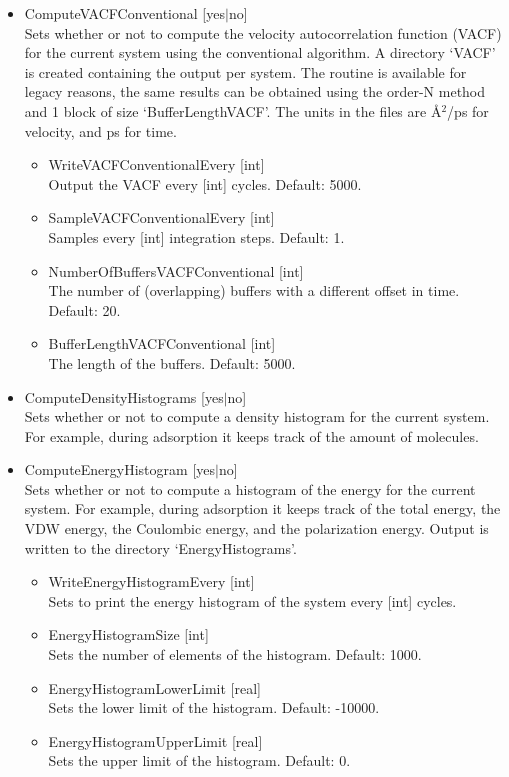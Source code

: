 \begin{itemize}
\item{ComputeVACFConventional [yes$|$no]}\\
Sets whether or not to compute the velocity autocorrelation function (VACF) for the current system using the conventional algorithm.
A directory `VACF' is created containing the output per system. The routine is available for legacy reasons, 
the same results can be obtained using the order-N method and 1 block of size `BufferLengthVACF'.
The units in the files are \AA$^2$/ps for velocity, and ps for time.
  \begin{itemize}
    \item{WriteVACFConventionalEvery [int]}\\
     Output the VACF every [int] cycles. Default: 5000.
    \item{SampleVACFConventionalEvery [int]}\\
    Samples every [int] integration steps. Default: 1.
    \item{NumberOfBuffersVACFConventional [int]}\\
    The number of (overlapping) buffers with a different offset in time. Default: 20.
    \item{BufferLengthVACFConventional [int]}\\
    The length of the buffers. Default: 5000.
   \end{itemize}

\item{ComputeDensityHistograms [yes$|$no]}\\
Sets whether or not to compute a density histogram for the current system. For example, during adsorption it keeps track of the amount of molecules.

\item{ComputeEnergyHistogram [yes$|$no]}\\
Sets whether or not to compute a histogram of the energy for the current system. 
For example, during adsorption it keeps track of the total energy, the VDW energy,
the Coulombic energy, and the polarization energy. Output is written to  the directory
`EnergyHistograms'.
\begin{itemize}
\item{WriteEnergyHistogramEvery [int]}\\
Sets to print the energy histogram of the system every [int] cycles.
\item{EnergyHistogramSize [int]}\\
Sets the number of elements of the histogram. Default: 1000.
\item{EnergyHistogramLowerLimit [real]}\\
Sets the lower limit of the histogram. Default: -10000.
\item{EnergyHistogramUpperLimit [real]}\\
Sets the upper limit of the histogram. Default: 0.
\end{itemize}


\end{itemize}

